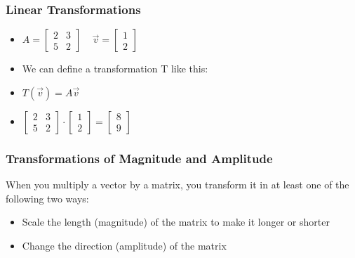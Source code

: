  \begin{frame}[fragile] \frametitle{Linear Transformations}

\begin{itemize}

\item $A = \begin{bmatrix}2 & 3\\5 & 2\end{bmatrix} \;\;\;\; \vec{v} = \begin{bmatrix}1\\2\end{bmatrix}$
\item We can define a transformation T like this:
\item $T(\vec{v}) = A\vec{v}$
\item $\begin{bmatrix}2 & 3\\5 & 2\end{bmatrix} \cdot  \begin{bmatrix}1\\2\end{bmatrix} = \begin{bmatrix}8\\9\end{bmatrix}$
\end{itemize}

\end{frame}


 \begin{frame}[fragile] \frametitle{Transformations of Magnitude and Amplitude}
When you multiply a vector by a matrix, you transform it in at least one of the following two ways:
\begin{itemize}

\item Scale the length (magnitude) of the matrix to make it longer or shorter
\item Change the direction (amplitude) of the matrix
\end{itemize}

\end{frame}

